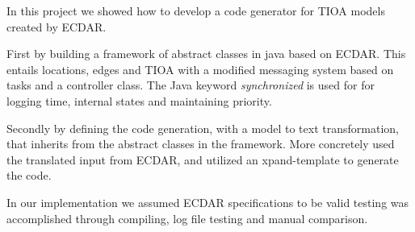 In this project we showed how to develop a code generator for TIOA 
models created by ECDAR. 

First by building a framework of abstract classes in java based on 
ECDAR. This entails locations, edges and TIOA with a modified messaging 
system based on tasks and a controller class. The Java keyword 
\textit{synchronized} is used for for logging time, internal states and 
maintaining priority. 

Secondly by defining the code generation, with a model to text 
transformation, that inherits from the abstract classes in the 
framework. More concretely used the translated input from ECDAR, and 
utilized an xpand-template to generate the code. 

In our implementation we assumed ECDAR specifications to be valid 
testing was accomplished through compiling, log file testing and manual 
comparison. 